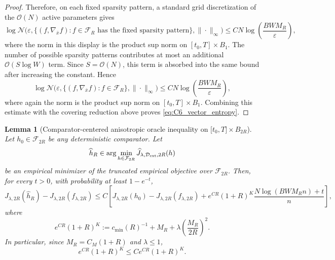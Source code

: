\documentclass[11pt]{article}
\theoremstyle{plain}
\newtheorem{lemma}[theorem]{Lemma}
\theoremstyle{definition}
\theoremstyle{remark}
\begin{document}
\begin{proof}
Therefore, on each fixed sparsity pattern, a standard grid discretization of
the \(\mathcal O(N)\) active parameters gives
\[
\log\mathcal N
\bigl(
\varepsilon,
\{(f,\nabla_{\bar x}f):f\in\mathcal F_R
\text{ has the fixed sparsity pattern}\},
\|\cdot\|_\infty
\bigr)
\le
C N
\log\left(\frac{BWM_R}{\varepsilon}\right),
\]
where the norm in this display is the product sup norm on
\([t_0,T]\times B_1\). The number of possible sparsity patterns contributes
at most an additional \(\mathcal O(S\log W)\) term. Since \(S=\mathcal O(N)\),
this term is absorbed into the same bound after increasing the constant.
Hence
\[
\log\mathcal N
\bigl(
\varepsilon,
\{(f,\nabla_{\bar x}f):f\in\mathcal F_R\},
\|\cdot\|_\infty
\bigr)
\le
C N
\log\left(\frac{BWM_R}{\varepsilon}\right),
\]
where again the norm is the product sup norm on \([t_0,T]\times B_1\).
Combining this estimate with the covering reduction above proves
\eqref{eq:C6_vector_entropy}.
\end{proof}




\iffalse

\begin{lemma}[Comparator-centered anisotropic oracle inequality on \(\lbrack t_0,T\rbrack\times B_{2R}\)]
\label{lem:C3-aniso-local-complexity}
Let \(h_0\in\mathcal F_{2R}\) be any deterministic comparator.
Let
\[
\widehat h_R
\in
\arg\min_{h\in\mathcal F_{2R}}
\widehat J_{\lambda,\mathcal D_{\rm ext},2R}(h)
\]
be an empirical minimizer of the truncated empirical objective over
\(\mathcal F_{2R}\). Then, for every \(t>0\), with probability at least
\(1-e^{-t}\),
\begin{equation}
\label{eq:C6_comparator_oracle}
J_{\lambda,2R}(\widehat h_R)-J_{\lambda,2R}(f_{\lambda,2R})
\le
C\left[
J_{\lambda,2R}(h_0)-J_{\lambda,2R}(f_{\lambda,2R})
+
e^{CR}(1+R)^K
\frac{N\log(BWM_R n)+t}{n}
\right],
\end{equation}
where
\begin{equation}
\label{eq:C6_Gamma_R_def_new}
e^{CR}(1+R)^K:=
c_{\min}(R)^{-1}
+
M_R
+
\lambda\left(\frac{M_R}{2R}\right)^2.
\end{equation}
In particular, since \(M_R=C_M(1+R)\) and \(\lambda\le1\),
\begin{equation}
\label{eq:C6_Gamma_R_growth_new}
e^{CR}(1+R)^K
\le
C e^{CR}(1+R)^K.
\end{equation}
\end{lemma}
\end{document}
